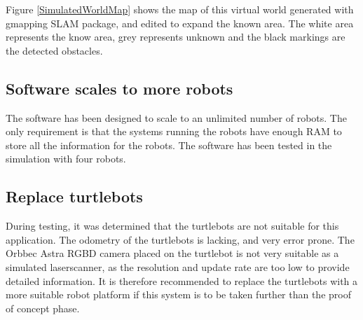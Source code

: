 \documentclass[10pt, journal]{IEEEtran}
\begin{document}
Figure \ref{SimulatedWorldMap} shows the map of this virtual world generated with gmapping SLAM package\cite{SLAMGmapping}, and edited to expand the known area. The white area represents the know area, grey represents unknown and the black markings are the detected obstacles.
\subsection{Software scales to more robots}
The software has been designed to scale to an unlimited number of robots. The only requirement is that the systems running the robots have enough RAM to store all the information for the robots. The software has been tested in the simulation with four robots.
\subsection{Replace turtlebots}
During testing, it was determined that the turtlebots are not suitable for this application. The odometry of the turtlebots is lacking, and very error prone. The Orbbec Astra RGBD camera placed on the turtlebot is not very suitable as a simulated laserscanner, as the resolution and update rate are too low to provide detailed information. It is therefore recommended to replace the turtlebots with a more suitable robot platform if this system is to be taken further than the proof of concept phase.



\end{document}
